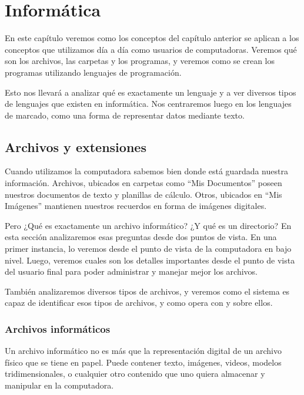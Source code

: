 
\chapter{Informática}

En este capítulo veremos como los conceptos del capítulo anterior se aplican a
los conceptos que utilizamos día a día como usuarios de computadoras.
Veremos qué son los archivos, las carpetas y los programas, y veremos como se
crean los programas utilizando lenguajes de programación.

Esto nos llevará a analizar qué es exactamente un lenguaje y a ver diversos tipos
de lenguajes que existen en informática. Nos centraremos luego en los lenguajes
de marcado, como una forma de representar datos mediante texto.

\section{Archivos y extensiones}

Cuando utilizamos la computadora sabemos bien donde está guardada nuestra información.
Archivos, ubicados en carpetas como ``Mis Documentos'' poseen nuestros documentos
de texto y planillas de cálculo. Otros, ubicados en ``Mis Imágenes'' mantienen
nuestros recuerdos en forma de imágenes digitales.

Pero ¿Qué es exactamente un archivo informático? ¿Y qué es un directorio?
En esta sección analizaremos esas preguntas desde dos puntos de vista. En
una primer instancia, lo veremos desde el punto de vista de la computadora
en bajo nivel. Luego, veremos cuales son los detalles importantes desde el punto
de vista del usuario final para poder administrar y manejar mejor los archivos.

También analizaremos diversos tipos de archivos, y veremos como el sistema es
capaz de identificar esos tipos de archivos, y como opera con y sobre ellos.

\subsection{Archivos informáticos}

Un archivo informático no es más que la representación digital de un archivo
físico que se tiene en papel. Puede contener texto, imágenes, videos, modelos
tridimensionales, o cualquier otro contenido que uno quiera almacenar y
manipular en la computadora.


